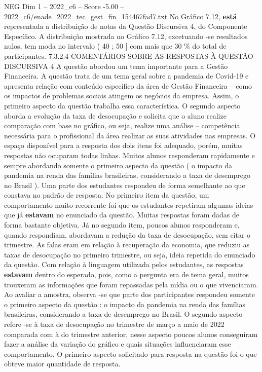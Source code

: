 \begin{textsample}{NEG Dim 1 – 2022\_c6 – Score -5.00 – 2022\_c6/enade\_2022\_tec\_gest\_fin\_154467fad7.txt}
No Gráfico 7.12, \textbf{está} representada a distribuição de notas da Questão Discursiva 4, do Componente Específico.
A distribuição mostrada no Gráfico 7.12, excetuando -se resultados nulos, tem moda no intervalo ( 40 ; 50 ] com mais que 30 \% do total de participantes. 7.3.2.4 COMENTÁRIOS SOBRE AS RESPOSTAS À QUESTÃO DISCURSIVA 4 A questão abordou um tema importante para a Gestão Financeira.
A questão trata de um tema geral sobre a pandemia de Covid-19 e apresenta relação com conteúdo específico da área de Gestão Financeira – como os impactos de problemas sociais atingem os negócios da empresa.
Assim, o primeiro aspecto da questão trabalha essa característica.
O segundo aspecto aborda a evolução da taxa de desocupação e solicita que o aluno realize comparação com base no gráfico, ou seja, realize uma análise – competência necessária para o profissional da área realizar as suas atividades nas empresas.
O espaço disponível para a resposta dos dois itens foi adequado, porém, muitas respostas não ocuparam todas linhas.
Muitos alunos responderam rapidamente e sempre abordando somente o primeiro aspecto da questão ( o impacto da pandemia na renda das famílias brasileiras, considerando a taxa de desemprego no Brasil ).
Uma parte dos estudantes respondeu de forma semelhante ao que constava no padrão de resposta.
No primeiro item da questão, um comportamento muito recorrente foi que os estudantes repetiram algumas ideias que já \textbf{estavam} no enunciado da questão.
Muitas respostas foram dadas de forma bastante objetiva.
Já no segundo item, poucos alunos responderam e, quando respondiam, abordavam a redução da taxa de desocupação, sem citar o trimestre.
As falas eram em relação à recuperação da economia, que reduziu as taxas de desocupação no primeiro trimestre, ou seja, ideia repetida do enunciado da questão.
Com relação à linguagem utilizada pelos estudantes, as respostas \textbf{estavam} dentro do esperado, pois, como a pergunta era de tema geral, muitos trouxeram as informações que foram repassadas pela mídia ou o que vivenciaram.
Ao avaliar a amostra, observa -se que parte dos participantes respondeu somente o primeiro aspecto da questão : o impacto da pandemia na renda das famílias brasileiras, considerando a taxa de desemprego no Brasil.
O segundo aspecto refere -se à taxa de desocupação no trimestre de março a maio de 2022 comparada com à do trimestre anterior, nesse aspecto poucos alunos conseguiram fazer a análise da variação do gráfico e quais situações influenciaram esse comportamento.
O primeiro aspecto solicitado para resposta na questão foi o que obteve maior quantidade de resposta.

\end{textsample}
